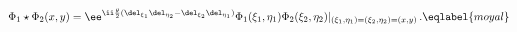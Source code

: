 \begin{equation}
\Phi_1\star\Phi_2 (x,y) = \ee^{\ii \frac\theta2(\del_{\xi_1}\del_{\eta_2} - 
\del_{\xi_2}\del_{\eta_1})} 
\Phi_1(\xi_1,\eta_1) \Phi_2(\xi_2,\eta_2) |_{(\xi_1,\eta_1)=(\xi_2,\eta_2)=(x,y)}\,.
\eqlabel{moyal}
\end{equation} 
